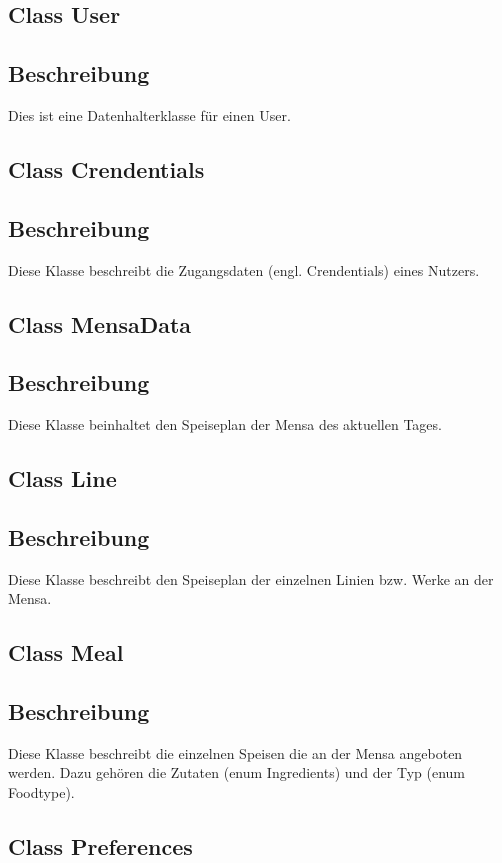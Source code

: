 \documentclass[a4paper]{scrreprt}
\begin{document}
\subsection{Class User}
\subsection*{Beschreibung}
Dies ist eine Datenhalterklasse für einen User.

\subsection{Class Crendentials}
\subsection*{Beschreibung}
Diese Klasse beschreibt die Zugangsdaten (engl. Crendentials) eines Nutzers.

\subsection{Class MensaData}
\subsection*{Beschreibung}
Diese Klasse beinhaltet den Speiseplan der Mensa des aktuellen Tages.

\subsection{Class Line}
\subsection*{Beschreibung}
Diese Klasse beschreibt den Speiseplan der einzelnen Linien bzw. Werke an der Mensa.

\subsection{Class Meal}
\subsection*{Beschreibung}
Diese Klasse beschreibt die einzelnen Speisen die an der Mensa angeboten werden.
Dazu gehören die Zutaten (enum Ingredients) und der Typ (enum Foodtype).

\subsection{Class Preferences}
\end{document}

